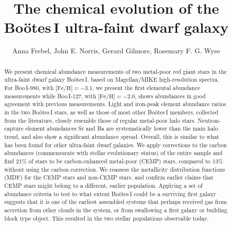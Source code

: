 \documentclass[]{emulateapj}
\begin{document}
\title{The chemical evolution of the Bo\"otes\,I ultra-faint dwarf
  galaxy\altaffilmark{*}}

\author{
Anna Frebel,
John E. Norris, 
Gerard Gilmore,
Rosemary F. G. Wyse}









\begin{abstract}

We present chemical abundance measurements of two metal-poor
  red giant stars in the ultra-faint dwarf galaxy Bo\"otes\,I, based
  on Magellan/MIKE high-resolution spectra. For Boo\,I-980, with
  $\mbox{[Fe/H]}=-3.1$, we present the first elemental abundance
  measurements while Boo\,I-127, with $\mbox{[Fe/H]}=-2.0$, shows
  abundances in good agreement with previous measurements.  Light and
  iron-peak element abundance ratios in the two Bo\"otes\,I stars, as
  well as those of most other Bo\"otes\,I members, collected from the
  literature, closely resemble those of regular metal-poor halo stars.
  Neutron-capture element abundances Sr and Ba are systematically
  lower than the main halo trend, and also show a significant
  abundance spread. Overall, this is similar to what has been found
  for other ultra-faint dwarf galaxies. We apply corrections to the
  carbon abundances (commensurate with stellar evolutionary status) of
  the entire sample and find 21\% of stars to be carbon-enhanced
  metal-poor (CEMP) stars, compared to 13\% without using the carbon
  correction. We reassess the metallicity distribution functions (MDF)
  for the CEMP stars and non-CEMP stars, and confirm earlier claims
  that CEMP stars might belong to a different, earlier
  population. Applying a set of abundance criteria to test to what
  extent Bo\"otes\,I could be a surviving first galaxy suggests that
  it is one of the earliest assembled systems that perhaps received
  gas from accretion from other clouds in the system, or
  from swallowing a first galaxy or building block type object. This
  resulted in the two stellar populations observable today.  
\end{abstract}
\end{document}
